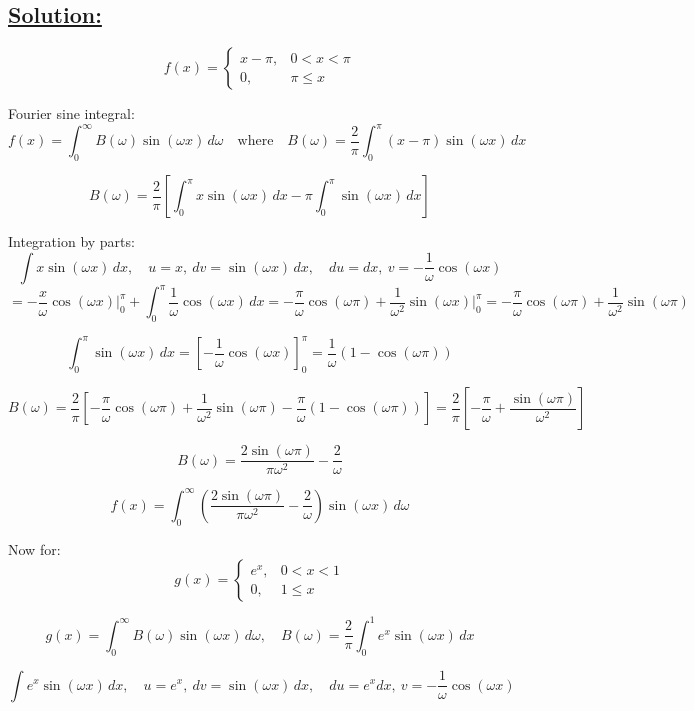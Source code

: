 \documentclass{article}
\begin{document}
\subsection*{\underline{Solution:}}

\[
f(x) =
\begin{cases}
x - \pi, & 0 < x < \pi \\
0, & \pi \leq x
\end{cases}
\]

Fourier sine integral:
\[
f(x) = \int_0^\infty B(\omega) \sin(\omega x) \, d\omega
\quad \text{where} \quad
B(\omega) = \frac{2}{\pi} \int_0^\pi (x - \pi) \sin(\omega x) \, dx
\]

\[
B(\omega) = \frac{2}{\pi} \left[ \int_0^\pi x \sin(\omega x) \, dx - \pi \int_0^\pi \sin(\omega x) \, dx \right]
\]

Integration by parts:
\[
\int x \sin(\omega x) \, dx,
\quad u = x,\ dv = \sin(\omega x)\, dx,
\quad du = dx,\ v = -\frac{1}{\omega} \cos(\omega x)
\]
\[
= -\frac{x}{\omega} \cos(\omega x) \Big|_0^\pi + \int_0^\pi \frac{1}{\omega} \cos(\omega x) \, dx
= -\frac{\pi}{\omega} \cos(\omega \pi) + \frac{1}{\omega^2} \sin(\omega x) \Big|_0^\pi
= -\frac{\pi}{\omega} \cos(\omega \pi) + \frac{1}{\omega^2} \sin(\omega \pi)
\]

\[
\int_0^\pi \sin(\omega x) \, dx = \left[ -\frac{1}{\omega} \cos(\omega x) \right]_0^\pi
= \frac{1}{\omega} \left(1 - \cos(\omega \pi)\right)
\]

\[
B(\omega) = \frac{2}{\pi} \left[ -\frac{\pi}{\omega} \cos(\omega \pi) + \frac{1}{\omega^2} \sin(\omega \pi)
- \frac{\pi}{\omega} \left(1 - \cos(\omega \pi)\right) \right]
= \frac{2}{\pi} \left[ -\frac{\pi}{\omega} + \frac{\sin(\omega \pi)}{\omega^2} \right]
\]

\[
B(\omega) = \frac{2 \sin(\omega \pi)}{\pi \omega^2} - \frac{2}{\omega}
\]

\[
f(x) = \int_0^\infty \left( \frac{2 \sin(\omega \pi)}{\pi \omega^2} - \frac{2}{\omega} \right) \sin(\omega x) \, d\omega
\]

Now for:
\[
g(x) =
\begin{cases}
e^x, & 0 < x < 1 \\
0, & 1 \leq x
\end{cases}
\]

\[
g(x) = \int_0^\infty B(\omega) \sin(\omega x) \, d\omega,
\quad
B(\omega) = \frac{2}{\pi} \int_0^1 e^x \sin(\omega x) \, dx
\]

\[
\int e^x \sin(\omega x) \, dx,
\quad u = e^x,\ dv = \sin(\omega x)\, dx,
\quad du = e^x dx,\ v = -\frac{1}{\omega} \cos(\omega x)
\]
\end{document}
